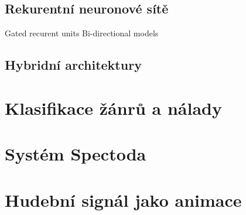   \subsection{Rekurentní neuronové sítě}
    Gated recurent units
    Bi-directional models

  \subsection{Hybridní architektury}

\section{Klasifikace žánrů a nálady}

\section{Systém Spectoda}

\section{Hudební signál jako animace}